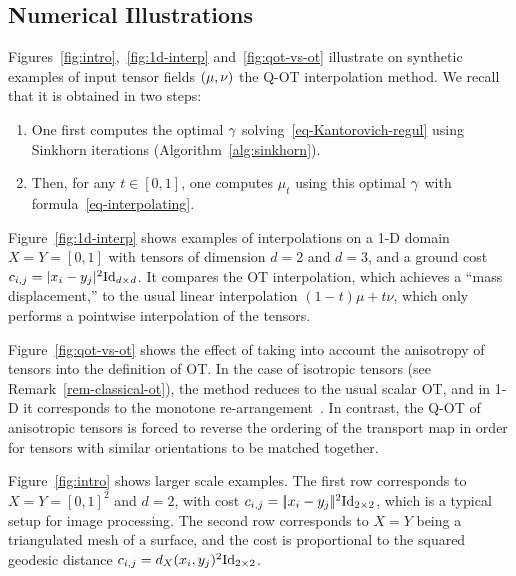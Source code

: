 
\subsection{Numerical Illustrations}
\label{sec-numerics-interp}

Figures~\ref{fig:intro},~\ref{fig:1d-interp} and~\ref{fig:qot-vs-ot} illustrate on synthetic examples of input tensor fields $(\mu,\nu)$ the Q-OT interpolation method. 
%
We recall that it is obtained in two steps:
\begin{enumerate}
	\item One first computes the optimal $\gamma$ solving~\eqref{eq-Kantorovich-regul} using Sinkhorn iterations (Algorithm~\ref{alg:sinkhorn}).
	\item Then, for any $t \in [0,1]$, one computes $\mu_t$ using this optimal $\gamma$ with formula~\eqref{eq-interpolating}.
\end{enumerate}
   
Figure~\ref{fig:1d-interp} shows examples of interpolations on a 1-D domain $X=Y=[0,1]$ with tensors of dimension $d=2$ and $d=3$, and a ground cost $c_{i,j}=|x_i-y_j|^2\mathrm{Id}_{d \times d}$. It compares the OT interpolation, which achieves a ``mass displacement,'' to the usual linear interpolation $(1-t)\mu+t\nu$, which only performs a pointwise interpolation of the tensors. 

Figure~\ref{fig:qot-vs-ot} shows the effect of taking into account the anisotropy of tensors into the definition of OT. In the case of isotropic tensors (see Remark~\ref{rem-classical-ot}), the method reduces to the usual scalar OT, and in 1-D it corresponds to the monotone re-arrangement~\cite{santambrogio2015optimal}. In contrast, the Q-OT of anisotropic tensors is forced to reverse the ordering of the transport map in order for tensors with similar orientations to be matched together. 

Figure~\ref{fig:intro} shows larger scale examples. 
%
The first row corresponds to $X=Y=[0,1]^2$ and $d=2$, with cost $c_{i,j}=|\!| x_i-y_j |\!|^2\mathrm{Id}_{2 \times 2}$, which is a typical setup for image processing.
%
The second row corresponds to $X=Y$ being a triangulated mesh of a surface, and the cost is proportional to the squared geodesic distance $c_{i,j}=d_X(x_i,y_j)^2 \mathrm{Id}_{2\times 2}$. 



